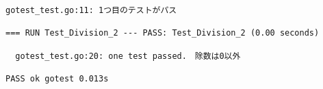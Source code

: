 \begin{enumerate}
\begin{lstlisting}[numbers=none]
  gotest_test.go:11: 1つ目のテストがパス

=== RUN Test_Division_2 --- PASS: Test_Division_2 (0.00 seconds)

  gotest_test.go:20: one test passed.　除数は0以外

PASS ok gotest 0.013s
\end{lstlisting}
\end{enumerate}
